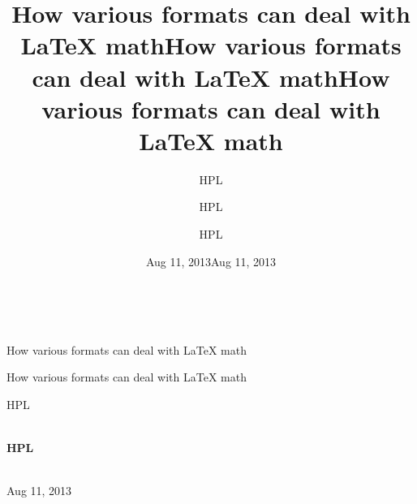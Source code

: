 \documentclass[%
oneside,                 %
final,                   %
10pt]{article}
\begin{document}







\title{How various formats can deal with {\LaTeX} math}


\thispagestyle{empty}
\hbox{\ \ }
\vfill
\begin{center}
{\huge{\bfseries{
\begin{spacing}{1.25}
How various formats can deal with {\LaTeX} math
\end{spacing}
}}}

\title*{How various formats can deal with {\LaTeX} math}

\title{How various formats can deal with {\LaTeX} math}
\begin{center}
{\LARGE\bf
\begin{spacing}{1.25}
How various formats can deal with {\LaTeX} math
\end{spacing}
}
\end{center}

\author{HPL}

\vspace{1.3cm}

    {\Large\textsf{HPL${}^{}$}}\\ [3mm]
    
\ \\ [2mm]


\author{HPL}

\author{HPL\inst{}}
\institute{}

\begin{center}
{\bf HPL${}^{}$} \\ [0mm]
\end{center}

\begin{center}
\end{center}


\date{Aug 11, 2013}
\maketitle
\date{Aug 11, 2013
}

\ \\ [10mm]
{\large\textsf{Aug 11, 2013}}

\end{center}
\vfill
\clearpage
\end{document}
